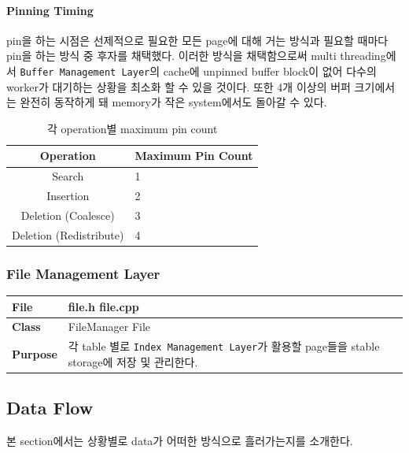 \documentclass[main.tex]{subfiles}
\begin{document}
\paragraph{Pinning Timing}
pin을 하는 시점은 선제적으로 필요한 모든 page에 대해 거는 방식과 필요할 때마다 pin을 하는 방식 중 후자를 채택했다. 이러한 방식을 채택함으로써 multi threading에서 \texttt{Buffer Management Layer}의 cache에 unpinned buffer block이 없어 다수의 worker가 대기하는 상황을 최소화 할 수 있을 것이다. 또한 4개 이상의 버퍼 크기에서는 완전히 동작하게 돼 memory가 작은 system에서도 돌아갈 수 있다.

\begin{table}[!htb]
	\centering
	\begin{tabularx}{.55\textwidth}{|c|X|}
		\hline
		Operation & Maximum Pin Count \\
		\hline
		Search & 1 \\
		\hline
		Insertion & 2 \\
		\hline
		Deletion (Coalesce) & 3 \\
		\hline
		Deletion (Redistribute) & 4 \\
		\hline
	\end{tabularx}
	\caption{각 operation별 maximum pin count}
\end{table}

\subsubsection{File Management Layer}
\begin{table}[!htb]
	\begin{tabularx}{\textwidth}{|l|X|}
		\hline
		\textbf{File} & file.h file.cpp \\
		\hline
		\textbf{Class} & FileManager File \\
		\hline
		\textbf{Purpose} & 각 table 별로 \texttt{Index Management Layer}가 활용할 page들을 stable storage에 저장 및 관리한다. \\
		\hline
	\end{tabularx}
\end{table}

\newpage
\subsection{Data Flow}
본 section에서는 상황별로 data가 어떠한 방식으로 흘러가는지를 소개한다.
\end{document}
